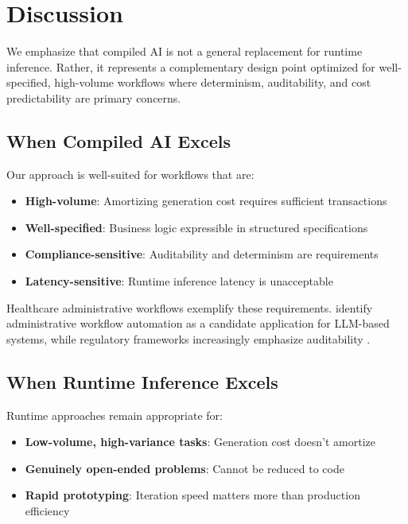 \documentclass[11pt]{article}
\begin{document}
\section{Discussion}
\label{sec:discussion}

We emphasize that compiled AI is not a general replacement for runtime inference. Rather, it represents a complementary design point optimized for well-specified, high-volume workflows where determinism, auditability, and cost predictability are primary concerns.

\subsection{When Compiled AI Excels}

Our approach is well-suited for workflows that are:
\begin{itemize}
    \item \textbf{High-volume}: Amortizing generation cost requires sufficient transactions
    \item \textbf{Well-specified}: Business logic expressible in structured specifications
    \item \textbf{Compliance-sensitive}: Auditability and determinism are requirements
    \item \textbf{Latency-sensitive}: Runtime inference latency is unacceptable
\end{itemize}

Healthcare administrative workflows exemplify these requirements. \citet{qiu2024healthcare} identify administrative workflow automation as a candidate application for LLM-based systems, while regulatory frameworks increasingly emphasize auditability \citep{fda2025}.

\subsection{When Runtime Inference Excels}

Runtime approaches remain appropriate for:
\begin{itemize}
    \item \textbf{Low-volume, high-variance tasks}: Generation cost doesn't amortize
    \item \textbf{Genuinely open-ended problems}: Cannot be reduced to code
    \item \textbf{Rapid prototyping}: Iteration speed matters more than production efficiency
\end{itemize}
\end{document}

